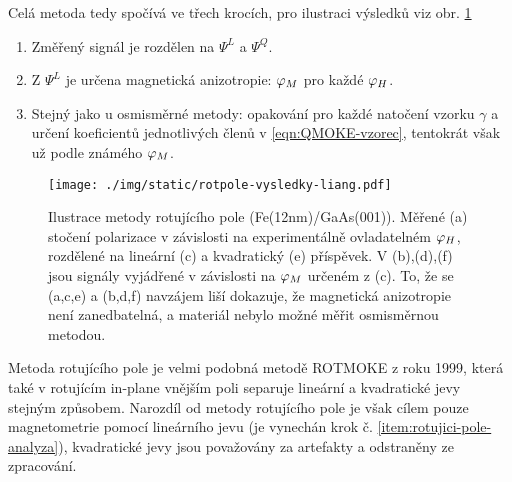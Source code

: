 Celá metoda tedy spočívá ve třech krocích, pro ilustraci výsledků viz obr. \ref{fig:metoda-rotujiciho-pole-vysledky}
\begin{enumerate}
    \item Změřený signál je rozdělen na $\Psi^L$ a $\Psi^Q$.
    \item Z $\Psi^L$ je určena magnetická anizotropie: $\varphi_M$ pro každé $\varphi_H$.
    \item Stejný jako u osmisměrné metody: opakování pro každé natočení vzorku $\gamma$ a určení koeficientů jednotlivých členů v \eqref{eqn:QMOKE-vzorec}, tentokrát však už podle známého $\varphi_M$. \label{item:rotujici-pole-analyza}
\end{enumerate}

\begin{figure}[htbp]
    \centering
    \texttt{[image: ./img/static/rotpole-vysledky-liang.pdf]}
    \caption{Ilustrace metody rotujícího pole (Fe(12nm)/GaAs(001)).
    Měřené (a) stočení polarizace v závislosti na experimentálně ovladatelném $\varphi_H$, rozdělené na lineární (c) a kvadratický (e) příspěvek. V (b),(d),(f) jsou signály vyjádřené v závislosti na $\varphi_M$ určeném z (c). To, že se (a,c,e) a (b,d,f) navzájem liší dokazuje, že magnetická anizotropie není zanedbatelná, a materiál nebylo možné měřit osmisměrnou metodou.
\cite{liangSeparationLinearQuadratic2015}}
    \label{fig:metoda-rotujiciho-pole-vysledky}
\end{figure}

Metoda rotujícího pole je velmi podobná metodě ROTMOKE\cite{mattheisDeterminationAnisotropyField1999} z roku 1999, která také v rotujícím in-plane vnějším poli separuje lineární a kvadratické jevy stejným způsobem.
Narozdíl od metody rotujícího pole je však cílem pouze magnetometrie pomocí lineárního jevu (je vynechán krok č. \ref{item:rotujici-pole-analyza}), kvadratické jevy jsou považovány za artefakty a odstraněny ze zpracování.
